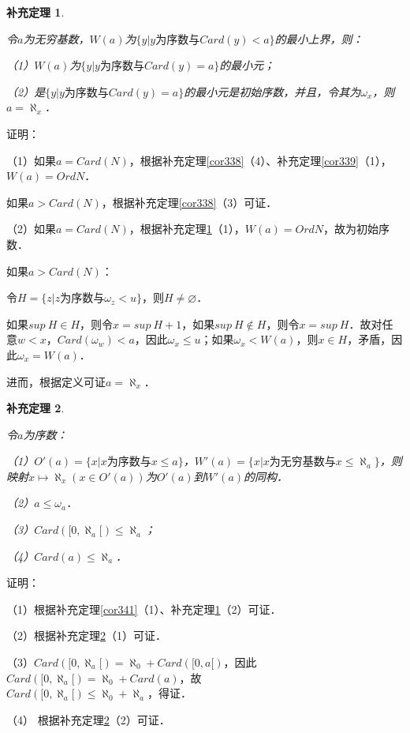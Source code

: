 \documentclass[12pt, a4paper, oneside]{book}
\newtheorem{cor}{补充定理}
\begin{document}
			\begin{cor}\label{cor343}
				\hfill\par
				令$a$为无穷基数，$W(a)$为$\{y|y\text{为序数}\text{与}Card(y)<a\}$的最小上界，则：
				\par
				（1）$W(a)$为$\{y|y\text{为序数}\text{与}Card(y)=a\}$的最小元；
				\par
				（2）是$\{y|y\text{为序数}\text{与}Card(y)=a\}$的最小元是初始序数，并且，令其为$\omega_x$，则$a=\aleph_x$．
			\end{cor}
			证明：
			\par
			（1）如果$a=Card(N)$，根据补充定理\ref{cor338}（4）、补充定理\ref{cor339}（1），$W(a)=Ord{N}$．
			\par
			如果$a>Card(N)$，根据补充定理\ref{cor338}（3）可证．
			\par
			（2）如果$a=Card(N)$，根据补充定理\ref{cor343}（1），$W(a)=Ord{N}$，故为初始序数．
			\par
			如果$a>Card(N)$：
			\par
			令$H=\{z|z\text{为序数}\text{与}\omega_z<u\}$，则$H\neq \varnothing$．
			\par
			如果$sup\ H\in H$，则令$x=sup\ H+1$，如果$sup\ H\notin H$，则令$x=sup\ H$．故对任意$w<x$，$Card(\omega_w)<a$，因此$\omega_x\leq u$；如果$\omega_x<W(a)$，则$x\in H$，矛盾，因此$\omega_x=W(a)$．
			\par
			进而，根据定义可证$a=\aleph_x$．
					
			\begin{cor}\label{cor344}
				\hfill\par
				令$a$为序数：
				\par
				（1）$O'(a)=\{x|x\text{为序数}\text{与}x\leq a\}$，$W'(a)=\{x|x\text{为无穷基数}\text{与}x\leq \aleph_a\}$，则映射$x\mapsto \aleph_x(x\in O'(a))$为$O'(a)$到$W'(a)$的同构．
				\par
				（2）$a\leq \omega_a$．
				\par
				（3）$Card([0, \aleph_a[)\leq \aleph_a$；
				\par
				（4）$Card(a)\leq \aleph_a$．
			\end{cor}
			证明：
			\par
			（1）根据补充定理\ref{cor341}（1）、补充定理\ref{cor343}（2）可证．
			\par
			（2）根据补充定理\ref{cor344}（1）可证．
			\par
			（3）$Card([0, \aleph_a[)=\aleph_0+Card([0, a[)$，因此$Card([0, \aleph_a[)=\aleph_0+Card(a)$，故\\$Card([0, \aleph_a[)\leq \aleph_0+\aleph_a$，得证．
			\par
			（4）	根据补充定理\ref{cor344}（2）可证．
			
\end{document}
